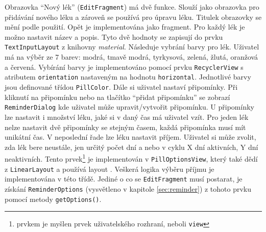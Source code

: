 \documentclass[../TakeYourPill.tex]{subfiles}
\begin{document}
Obrazovka \enquote{Nový lék} (\texttt{EditFragment}) má dvě funkce. Slouží jako obrazovka pro přidávání nového léku a zároveň se používá pro úpravu léku. Titulek obrazovky se mění podle použití. Opět je implementována jako fragment. Pro každý lék je možno nastavit název a popis. Tyto dvě hodnoty se zapisují do prvku \texttt{TextInputLayout} z knihovny \textit{material}. Následuje vybrání barvy pro lék. Uživatel má na výběr ze 7 barev: modrá, tmavě modrá, tyrkysová, zelená, žlutá, oranžová a červená. Vybírání barvy je implementováno pomocí prvku \texttt{RecyclerView} s atributem \texttt{orientation} nastaveným na hodnotu \texttt{horizontal}. Jednotlivé barvy jsou definované třídou \texttt{PillColor}. Dále si uživatel nastaví připomínky. Při kliknutí na připomínku nebo na tlačítko \enquote{přidat připomínku} se zobrazí \texttt{ReminderDialog} kde uživatel může upravit/vytvořit připomínku. U připomínky lze nastavit i množství léku, jaké si v daný čas má uživatel vzít. Pro jeden lék nelze nastavit dvě připomínky se stejným časem, každá připomínka musí mít unikátní čas. V neposlední řade lze léku nastavit příjem. Uživatel si může zvolit, zda lék bere neustále, jen určitý počet dní a nebo v cyklu X dní aktivních, Y dní neaktivních. Tento prvek\footnote{prvkem je myšlen prvek uživatelského rozhraní, neboli \texttt{view}} je implementován v \texttt{PillOptionsView}, který také dědí z \texttt{LinearLayout} a používá layout . Veškerá logika výběru příjmu je implementována v této třídě. Jediné o co se \texttt{EditFragment} musí postarat, je získání \texttt{ReminderOptions} (vysvětleno v kapitole \ref{sec:reminder}) z tohoto prvku pomocí metody \texttt{getOptions()}.
\end{document}
